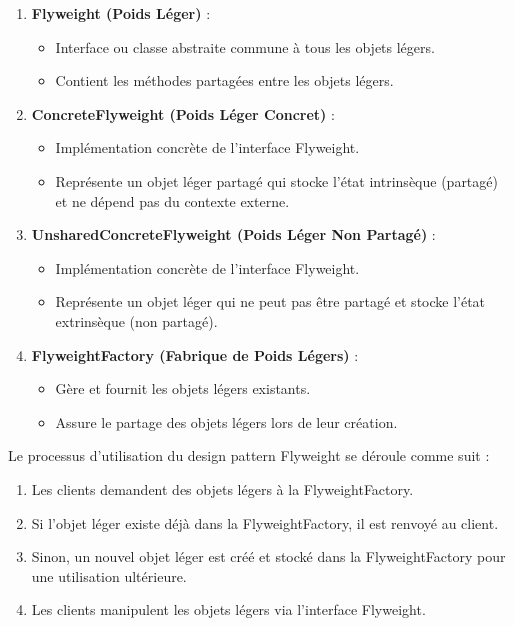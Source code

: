 \begin{enumerate}[leftmargin=*,labelsep=3mm]
    \item \textbf{Flyweight (Poids Léger)} :
    \begin{itemize}
        \item Interface ou classe abstraite commune à tous les objets légers.
        \item Contient les méthodes partagées entre les objets légers.
    \end{itemize}
    
    \item \textbf{ConcreteFlyweight (Poids Léger Concret)} :
    \begin{itemize}
        \item Implémentation concrète de l'interface Flyweight.
        \item Représente un objet léger partagé qui stocke l'état intrinsèque (partagé) et ne dépend pas du contexte externe.
    \end{itemize}
    
    \item \textbf{UnsharedConcreteFlyweight (Poids Léger Non Partagé)} :
    \begin{itemize}
        \item Implémentation concrète de l'interface Flyweight.
        \item Représente un objet léger qui ne peut pas être partagé et stocke l'état extrinsèque (non partagé).
    \end{itemize}
    
    \item \textbf{FlyweightFactory (Fabrique de Poids Légers)} :
    \begin{itemize}
        \item Gère et fournit les objets légers existants.
        \item Assure le partage des objets légers lors de leur création.
    \end{itemize}
\end{enumerate}

Le processus d'utilisation du design pattern Flyweight se déroule comme suit :

\begin{enumerate}[leftmargin=*,labelsep=3mm]
    \item Les clients demandent des objets légers à la FlyweightFactory.
    \item Si l'objet léger existe déjà dans la FlyweightFactory, il est renvoyé au client.
    \item Sinon, un nouvel objet léger est créé et stocké dans la FlyweightFactory pour une utilisation ultérieure.
    \item Les clients manipulent les objets légers via l'interface Flyweight.
\end{enumerate}

